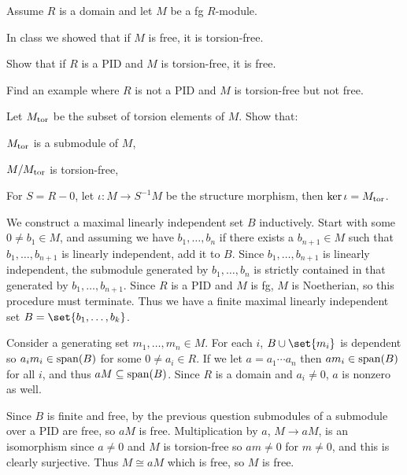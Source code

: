 \def\tor{{\rm tor}}

\bprob

    Assume $R$ is a domain and let $M$ be a fg $R$-module.
    \benum
        \item In class we showed that if $M$ is free, it is torsion-free.
        \benum
            \item Show that if $R$ is a PID and $M$ is torsion-free, it is free.
            \item Find an example where $R$ is not a PID and $M$ is torsion-free but not free.
        \eenum
        \item Let $M_\tor$ be the subset of torsion elements of $M$.
        Show that:
        \benum
            \item $M_\tor$ is a submodule of $M$,
            \item $M/M_\tor$ is torsion-free,
            \item For $S=R-0$, let $\iota\colon M\to S^{-1}M$ be the structure morphism, then $\ker\iota=M_\tor$.
        \eenum
    \eenum

\eprob

\benum
    \item
    \benum
        \item We construct a maximal linearly independent set $B$ inductively.
        Start with some $0\neq b_1\in M$, and assuming we have $b_1,\dots,b_n$ if there exists a $b_{n+1}\in M$ such that $b_1,\dots,b_{n+1}$ is linearly independent, add it to $B$.
        Since $b_1,\dots,b_{n+1}$ is linearly independent, the submodule generated by $b_1,\dots,b_n$ is strictly contained in that generated by $b_1,\dots,b_{n+1}$.
        Since $R$ is a PID and $M$ is fg, $M$ is Noetherian, so this procedure must terminate.
        Thus we have a finite maximal linearly independent set $B=\set{b_1,\dots,b_k}$.

        Consider a generating set $m_1,\dots,m_n\in M$.
        For each $i$, $B\cup\set{m_i}$ is dependent so $a_im_i\in{\rm span}(B)$ for some $0\neq a_i\in R$.
        If we let $a=a_1\cdots a_n$ then $am_i\in{\rm span}(B)$ for all $i$, and thus $aM\subseteq{\rm span}(B)$.
        Since $R$ is a domain and $a_i\neq0$, $a$ is nonzero as well.

        Since $B$ is finite and free, by the previous question submodules of a submodule over a PID are free, so $aM$ is free.
        Multiplication by $a$, $M\to aM$, is an isomorphism since $a\neq0$ and $M$ is torsion-free so $am\neq0$ for $m\neq0$, and this is clearly surjective.
        Thus $M\cong aM$ which is free, so $M$ is free.

